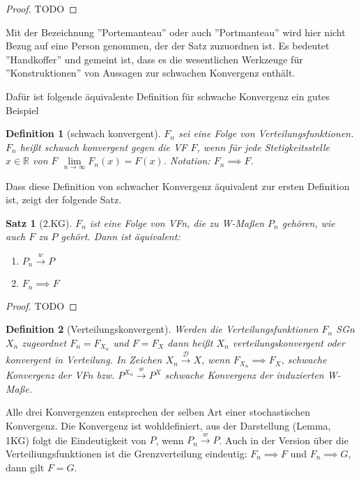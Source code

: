 \documentclass[]{article}
\newtheorem{theorem}{Satz}
\newtheorem{definition}{Definition}
\begin{document}
\begin{proof}
	TODO
\end{proof}

Mit der Bezeichnung ''Portemanteau'' oder auch ''Portmanteau'' wird hier nicht Bezug auf eine Person genommen, der der Satz zuzuordnen ist. Es bedeutet ''Handkoffer'' und gemeint ist, dass es die wesentlichen Werkzeuge für ''Konstruktionen'' von Aussagen zur schwachen Konvergenz enthält.

Dafür ist folgende äquivalente Definition für schwache Konvergenz ein gutes Beispiel
\begin{definition}[schwach konvergent]
	$F_n$ sei eine Folge von Verteilungsfunktionen. $F_n$ heißt schwach konvergent gegen die VF $F$, wenn für jede Stetigkeitsstelle $x\in\mathbb{R}$ von $F$ $\lim\limits_{n\rightarrow\infty} F_n(x) = F(x)$. Notation: $F_n \implies F$.
\end{definition}

Dass diese Definition von schwacher Konvergenz äquivalent zur ersten Definition ist, zeigt der folgende Satz.
\begin{theorem}[2.KG]
	$F_n$ ist eine Folge von VFn, die zu W-Maßen $P_n$ gehören, wie auch $F$ zu $P$ gehört. Dann ist äquivalent:
	\begin{enumerate}
		\item $P_n \xrightarrow{w} P$
		\item $F_n \implies F$
	\end{enumerate}
\end{theorem}

\begin{proof}
	TODO
\end{proof}

\begin{definition}[Verteilungskonvergent]
	Werden die Verteilungsfunktionen $F_n$ SGn $X_n$ zugeordnet $F_n = F_{X_n}$ und $F=F_X$ dann heißt $X_n$ verteilungskonvergent oder konvergent in Verteilung. In Zeichen $X_n \xrightarrow{\mathcal{D}} X$, wenn $F_{X_n}\implies F_X$, schwache Konvergenz der VFn bzw. $P^{X_n} \xrightarrow{w} P^X$ schwache Konvergenz der induzierten W-Maße.
\end{definition}

Alle drei Konvergenzen entsprechen der selben Art einer stochastischen Konvergenz. Die Konvergenz ist wohldefiniert, aus der Darstellung (Lemma, 1KG) folgt die Eindeutigkeit von $P$, wenn $P_n\xrightarrow{w}P$. Auch in der Version über die Verteiliungsfunktionen ist die Grenzverteilung eindeutig: $F_n\implies F$ und $F_n \implies G$, dann gilt $F=G$.
\end{document}
